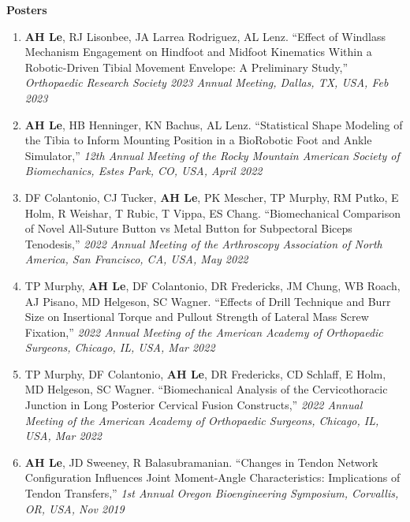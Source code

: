 \documentclass[10pt]{letter}
\begin{document}
\begin{center}
\textbf{Posters} \\
\end{center}
\vspace{-5pt}
\begin{justify}
\begin{enumerate}[leftmargin=*]
    \item \textbf{AH Le}, RJ Lisonbee, JA Larrea Rodriguez, AL Lenz.
        ``Effect of Windlass Mechanism Engagement on Hindfoot and Midfoot Kinematics Within a Robotic-Driven Tibial Movement Envelope: A Preliminary Study,''
        \textit{Orthopaedic Research Society 2023 Annual Meeting, Dallas, TX, USA, Feb 2023}

    \item \textbf{AH Le}, HB Henninger, KN Bachus, AL Lenz.
        ``Statistical Shape Modeling of the Tibia to Inform Mounting Position in a BioRobotic Foot and Ankle Simulator,''
        \textit{12th Annual Meeting of the Rocky Mountain American Society of Biomechanics, Estes Park, CO, USA, April 2022}

    \item DF Colantonio, CJ Tucker, \textbf{AH Le}, PK Mescher, TP Murphy, RM Putko, E Holm, R Weishar, T Rubic, T Vippa, ES Chang.
        ``Biomechanical Comparison of Novel All-Suture Button vs Metal Button for Subpectoral Biceps Tenodesis,''
        \textit{2022 Annual Meeting of the Arthroscopy Association of North America, San Francisco, CA, USA, May 2022}

    \item TP Murphy, \textbf{AH Le}, DF Colantonio, DR Fredericks, JM Chung, WB Roach, AJ Pisano, MD Helgeson, SC Wagner.
        ``Effects of Drill Technique and Burr Size on Insertional Torque and Pullout Strength of Lateral Mass Screw Fixation,''
        \textit{2022 Annual Meeting of the American Academy of Orthopaedic Surgeons, Chicago, IL, USA, Mar 2022}
    
    \item TP Murphy, DF Colantonio, \textbf{AH Le}, DR Fredericks, CD Schlaff, E Holm, MD Helgeson, SC Wagner.
        ``Biomechanical Analysis of the Cervicothoracic Junction in Long Posterior Cervical Fusion Constructs,''
        \textit{2022 Annual Meeting of the American Academy of Orthopaedic Surgeons, Chicago, IL, USA, Mar 2022}

    \item \textbf{AH Le}, JD Sweeney, R Balasubramanian.
        ``Changes in Tendon Network Configuration Influences Joint Moment-Angle Characteristics: Implications of Tendon Transfers,''
        \textit{1st Annual Oregon Bioengineering Symposium, Corvallis, OR, USA, Nov 2019}
    

\end{enumerate}
\end{justify}
\end{document}
